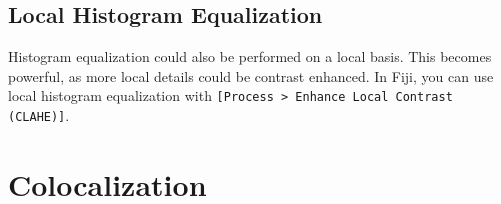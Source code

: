 \subsection{Local Histogram Equalization}
Histogram equalization could also be performed on a local basis. This becomes powerful, as more local details could be contrast enhanced. In Fiji, you can use local histogram equalization with \texttt{[Process > Enhance Local Contrast (CLAHE)]}.

\section{Colocalization}

